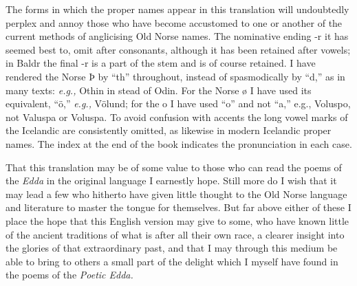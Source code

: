 \documentclass{scrbook}
\begin{document}

The forms in which the proper names appear in this translation will undoubtedly perplex and annoy those who have become accustomed to one or another of the current methods of anglicising Old Norse names. The nominative ending -r it has seemed best to, omit after consonants, although it has been retained after vowels; in Baldr the final -r is a part of the stem and is of course retained. I have rendered the Norse Þ by ``th'' throughout, instead of spasmodically by ``d,'' as in many texts: \emph{e.g.,} Othin in stead of Odin. For the Norse ø I have used its equivalent, ``ö,'' \emph{e.g.,} Völund; for the o I have used ``o'' and not ``a,'' e.g., Voluspo, not Valuspa or Voluspa. To avoid confusion with accents the long vowel marks of the Icelandic are consistently omitted, as likewise in modern Icelandic proper names. The index at the end of the book indicates the pronunciation in each case.


That this translation may be of some value to those who can read the poems of the \emph{Edda} in the original language I earnestly hope. Still more do I wish that it may lead a few who hitherto have given little thought to the Old Norse language and literature to master the tongue for themselves. But far above either of these I place the hope that this English version may give to some, who have known little of the ancient traditions of what is after all their own race, a clearer insight into the glories of that extraordinary past, and that I may through this medium be able to bring to others a small part of the delight which I myself have found in the poems of the \emph{Poetic Edda.}




%
\end{document}
